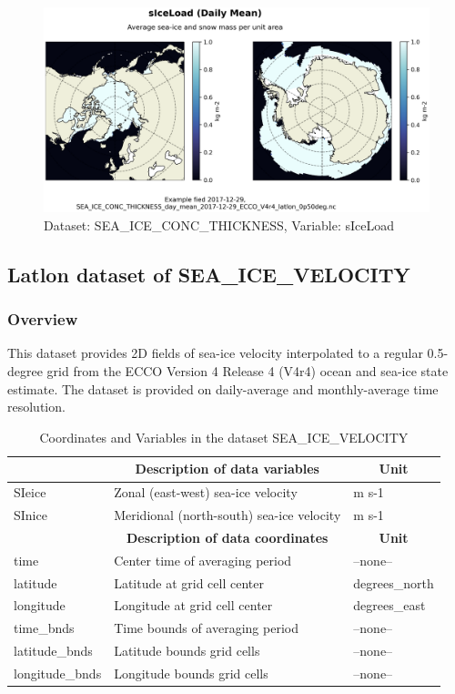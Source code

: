 \begin{figure}[H]
\centering
\includegraphics[scale=0.55]{../images/plots/latlon_plots/Sea-Ice_and_Snow_Concentration_and_Thickness/sIceLoad.png}
\caption{Dataset: SEA\_ICE\_CONC\_THICKNESS, Variable: sIceLoad}
\label{tab:table-SEA_ICE_CONC_THICKNESS_sIceLoad-Plot}
\end{figure}
\subsection{Latlon dataset of SEA\_ICE\_VELOCITY}
\newp
\subsubsection{Overview}
This dataset provides 2D fields of sea-ice velocity interpolated to a regular 0.5-degree grid from the ECCO Version 4 Release 4 (V4r4) ocean and sea-ice state estimate. The dataset is provided on daily-average and monthly-average time resolution. 
\begin{longtable}{|m{}|m{}|m{}|}
\caption{Coordinates and Variables in the dataset SEA\_ICE\_VELOCITY}
\label{tab:table-SEA_ICE_VELOCITY-fields} \\ 
\hline \endhead \hline \endfoot
\rowcolor{lightgray} \multicolumn{1}{|c|}{\textbf{Variables}} & \multicolumn{1}{|c|}{\textbf{Description of data variables}} &  \multicolumn{1}{|c|}{\textbf{Unit}}\\ \hline
SIeice &Zonal (east-west) sea-ice velocity &m s-1  \\ \hline
SInice &Meridional (north-south) sea-ice velocity &m s-1  \\ \hline
\rowcolor{lightgray} \multicolumn{1}{|c|}{\textbf{Coordinates}} & \multicolumn{1}{|c|}{\textbf{Description of data coordinates}} &  \multicolumn{1}{|c|}{\textbf{Unit}}\\ \hline
time &Center time of averaging period &--none--  \\ \hline
latitude &Latitude at grid cell center &degrees\_north  \\ \hline
longitude &Longitude at grid cell center &degrees\_east  \\ \hline
time\_bnds &Time bounds of averaging period &--none--  \\ \hline
latitude\_bnds &Latitude bounds grid cells &--none--  \\ \hline
longitude\_bnds &Longitude bounds grid cells &--none--  \\ \hline
\end{longtable}

